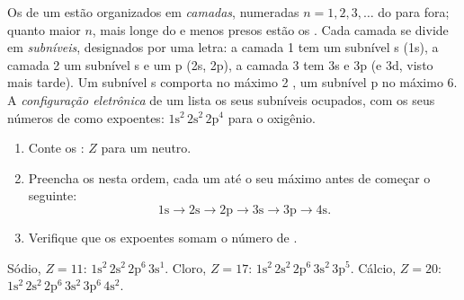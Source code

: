 \begin{definition}\label{def:g10:electron-shells:configuration}
Os  de um  estão organizados em
\emph{camadas}, numeradas $n = 1, 2, 3, \ldots$ do 
para fora; quanto maior $n$, mais longe do  e menos presos estão
os . Cada camada se divide em
\emph{subníveis}, designados por uma letra: a camada 1
tem um subnível s (1s), a camada 2 um subnível s e um p (2s, 2p), a
camada 3 tem 3s e 3p (e 3d, visto mais tarde). Um subnível s comporta no
máximo 2 , um subnível p no máximo 6. A \emph{configuração
eletrônica} de um  lista os seus
subníveis ocupados, com os seus números de  como expoentes:
$1\mathrm{s}^2\,2\mathrm{s}^2\,2\mathrm{p}^4$ para o oxigênio.
\end{definition}

\begin{method}[Escrever uma configuração eletrônica, até $Z = 20$]\label{met:g10:electron-shells:write}
\begin{enumerate}
  \item Conte os : $Z$ para um  neutro.
  \item Preencha os  nesta ordem, cada um até o seu máximo
        antes de começar o seguinte:
        \[
          1\mathrm{s} \to 2\mathrm{s} \to 2\mathrm{p} \to 3\mathrm{s} \to
          3\mathrm{p} \to 4\mathrm{s}.
        \]
  \item Verifique que os expoentes somam o número de .
\end{enumerate}
Sódio, $Z = 11$: $1\mathrm{s}^2\,2\mathrm{s}^2\,2\mathrm{p}^6\,3\mathrm{s}^1$.
Cloro, $Z = 17$: $1\mathrm{s}^2\,2\mathrm{s}^2\,2\mathrm{p}^6\,3\mathrm{s}^2\,3\mathrm{p}^5$.
Cálcio, $Z = 20$: $1\mathrm{s}^2\,2\mathrm{s}^2\,2\mathrm{p}^6\,3\mathrm{s}^2\,3\mathrm{p}^6\,4\mathrm{s}^2$.
\end{method}

